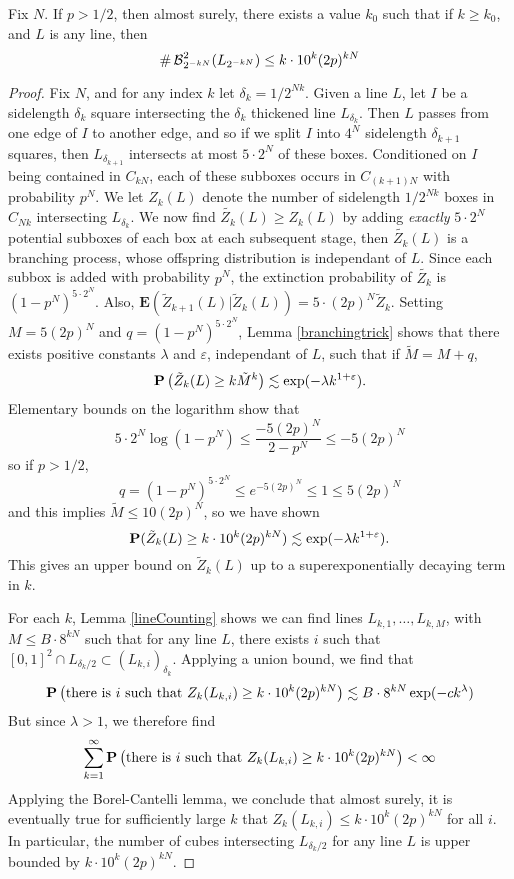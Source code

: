 \begin{lemma} \label{lineBounding}
	Fix $N$. If $p > 1/2$, then almost surely, there exists a value $k_0$ such that if $k \geq k_0$, and $L$ is any line, then
	\[ \# \operatorname{\mathcal{B}}^2_{2^{-kN}}(L_{2^{-kN}}) \leq k \cdot 10^k (2p)^{kN} \]
\end{lemma}
\begin{proof}
	Fix $N$, and for any index $k$ let $\delta_k = 1/2^{Nk}$. Given a line $L$, let $I$ be a sidelength $\delta_k$ square intersecting the $\delta_k$ thickened line $L_{\delta_k}$. Then $L$ passes from one edge of $I$ to another edge, and so if we split $I$ into $4^N$ sidelength $\delta_{k+1}$ squares, then $L_{\delta_{k+1}}$ intersects at most $5 \cdot 2^N$ of these boxes. Conditioned on $I$ being contained in $C_{kN}$, each of these subboxes occurs in $C_{(k+1)N}$ with probability $p^N$. We let $Z_k(L)$ denote the number of sidelength $1/2^{Nk}$ boxes in $C_{Nk}$ intersecting $L_{\delta_k}$. We now find $\tilde{Z_k}(L) \geq Z_k(L)$ by adding {\it exactly} $5 \cdot 2^N$ potential subboxes of each box at each subsequent stage, then $\tilde{Z_k}(L)$ is a branching process, whose offspring distribution is independant of $L$. Since each subbox is added with probability $p^N$, the extinction probability of $\tilde{Z_k}$ is $(1 - p^N)^{5 \cdot 2^N}$. Also, $\mathbf{E}(\tilde{Z}_{k+1}(L)|\tilde{Z}_k(L)) = 5 \cdot (2p)^N \tilde{Z}_k$.  Setting $M = 5 (2p)^N$ and $q = (1 - p^N)^{5 \cdot 2^N}$, Lemma \ref{branchingtrick} shows that there exists positive constants $\lambda$ and $\varepsilon$, independant of $L$, such that if $\tilde{M} = M + q$,
	\[ \operatorname{\mathbf{P}} \left( \tilde{Z}_k(L) \geq k \tilde{M}^k \right) \lesssim \exp(- \lambda k^{1 + \varepsilon}). \]
	Elementary bounds on the logarithm show that
	\[ 5 \cdot 2^N \log(1 - p^N) \leq \frac{-5 (2p)^N}{2 - p^N} \leq -5(2p)^N \]
	so if $p > 1/2$,
	\[ q = (1 - p^N)^{5 \cdot 2^N} \leq e^{-5 (2p)^N} \leq 1 \leq 5(2p)^N \]
	and this implies $\tilde{M} \leq 10 (2p)^N$, so we have shown
	\[ \operatorname{\mathbf{P}} ( \tilde{Z}_k(L) \geq k \cdot 10^k (2p)^{kN}) \lesssim \exp( - \lambda k^{1 + \varepsilon}). \]
	This gives an upper bound on $\tilde{Z}_k(L)$ up to a superexponentially decaying term in $k$.

	For each $k$, Lemma \ref{lineCounting} shows we can find lines $L_{k,1}, \dots, L_{k,M}$, with $M \leq B \cdot 8^{kN}$ such that for any line $L$, there exists $i$ such that $[0,1]^2 \cap L_{\delta_k/2} \subset (L_{k,i})_{\delta_k}$. Applying a union bound, we find that
	\[ \operatorname{\mathbf{P}} \left( \text{there is $i$ such that}\ Z_k(L_{k,i}) \geq k \cdot 10^k (2p)^{kN} \right) \lesssim B \cdot 8^{kN} \exp(-c k^\lambda) \]
	But since $\lambda > 1$, we therefore find
	\[ \sum_{k = 1}^\infty \operatorname{\mathbf{P}} \left( \text{there is $i$ such that}\ Z_k(L_{k,i}) \geq k \cdot 10^k (2p)^{kN} \right) < \infty \]
	Applying the Borel-Cantelli lemma, we conclude that almost surely, it is eventually true for sufficiently large $k$ that $Z_k(L_{k,i}) \leq k \cdot 10^k (2p)^{kN}$ for all $i$. In particular, the number of cubes intersecting $L_{\delta_k/2}$ for any line $L$ is upper bounded by $k \cdot 10^k (2p)^{kN}$.
\end{proof}

